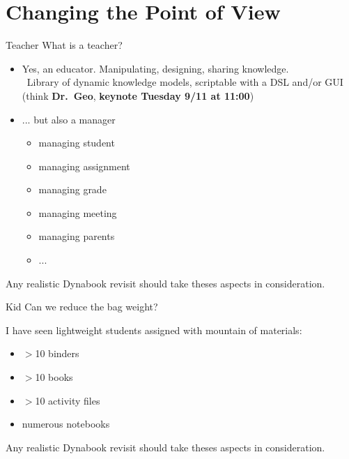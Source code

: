 \documentclass{beamer}
\newcommand{\tip}{\boldmath{\textcolor{red}{$\Rightarrow$}}}
\newcommand{\drgeo}{Dr.~Geo}
\begin{document}
\section{Changing the Point of View}
\begin{frame}{Teacher}
  What is a teacher?
  \vspace*{10pt}
  \begin{itemize}
  \item Yes, an educator. Manipulating, designing, sharing knowledge.\\
    \tip\ Library of dynamic knowledge models, scriptable with a DSL
    and/or GUI (think \textbf{\drgeo}, \textbf{keynote Tuesday 9/11 at 11:00})

  \item ... but also a manager
    \begin{itemize}
    \item managing student
    \item managing assignment
    \item managing grade
    \item managing meeting
    \item managing parents
    \item ...
    \end{itemize}
  \end{itemize}
  \vspace*{10pt}

  Any realistic Dynabook revisit should take theses aspects in
  consideration.
\end{frame}
%
\begin{frame}{Kid}
  Can we reduce the bag weight?

  \vspace*{10pt}

  I have seen lightweight students assigned with mountain of materials:
  \begin{itemize}
  \item $>$10 binders
  \item $>$10 books
  \item $>$10 activity files
  \item numerous notebooks
  \end{itemize}

  \vspace*{10pt}
  
  Any realistic Dynabook revisit should take theses aspects in
  consideration.

\end{frame}
%
\end{document}
